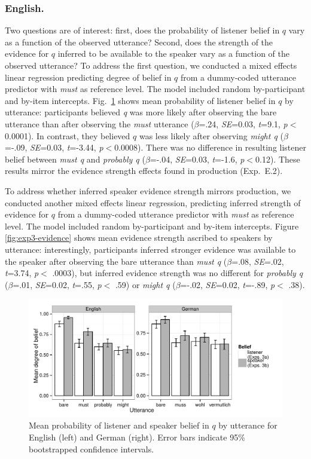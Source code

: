 \documentclass[11pt]{article}
\newcommand{\figref}[1]{Figure \ref{#1}}
\begin{document}
\subsubsection{English.} Two questions are of interest: first, does the probability of listener belief in $q$ vary as a function of the observed utterance? Second, does the strength of the evidence for $q$ inferred to be available to the speaker vary as a function of the observed utterance? To address the first question, we conducted a mixed effects linear regression predicting degree of belief in $q$ from a dummy-coded utterance predictor with \emph{must} as reference level. The model included random by-participant and by-item intercepts. Fig.~\ref{fig:expt3} shows mean probability of listener belief in $q$ by utterance: participants believed \emph{q} was more likely after observing the bare utterance than after observing the \emph{must} utterance   ($\beta$=.24, \emph{SE}=0.03, \emph{t}=9.1, \emph{p}$<$0.0001). In contrast, they believed $q$ was less likely after observing \emph{might q} ($\beta$=-.09, \emph{SE}=0.03, \emph{t}=-3.44, \emph{p}$<$0.0008). There was no difference in resulting listener belief between \emph{must q} and \emph{probably q} ($\beta$=-.04, \emph{SE}=0.03, \emph{t}=-1.6, \emph{p}$<$0.12). These results mirror the evidence strength effects found in production (Exp.~E.2). 

To address whether inferred speaker evidence strength mirrors production, we conducted another mixed effects linear regression, predicting inferred strength of evidence for $q$ from a dummy-coded utterance predictor with \emph{must} as reference level. The model included random by-participant and by-item intercepts.  \figref{fig:exp3-evidence} shows mean evidence strength ascribed to speakers by utterance:  interestingly, participants inferred stronger evidence was available to the speaker after observing the bare utterance than \emph{must q} ($\beta$=.08, \emph{SE}=.02, \emph{t}=3.74, \emph{p}$<$ .0003), but inferred evidence strength was no different for \emph{probably q} ($\beta$=.01, \emph{SE}=0.02, \emph{t}=.55, \emph{p}$<$ .59) or \emph{might q} ($\beta$=-.02, \emph{SE}=0.02, \emph{t}=-.89, \emph{p}$<$ .38).

\begin{figure}
	\centering
	\includegraphics[width=\textwidth]{pics/mean-beliefs}
	\caption{Mean probability of listener and speaker belief in $q$ by utterance for English (left) and German (right). Error bars indicate 95\% bootstrapped confidence intervals.}
	\label{fig:expt3}
\end{figure}
\end{document}
